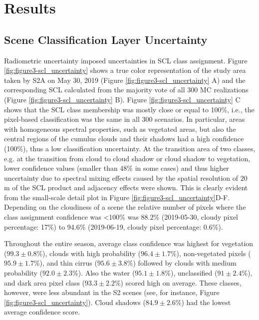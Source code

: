 \section{Results}
\label{sec:unc_results}

\subsection{Scene Classification Layer Uncertainty}
Radiometric uncertainty imposed uncertainties in \gls{SCL} class assignment. Figure \ref{fig:figure3-scl_uncertainty} shows a true color representation of the study area taken by S2A on May 30, 2019 (Figure \ref{fig:figure3-scl_uncertainty} A) and the corresponding \gls{SCL} calculated from the majority vote of all 300  \gls{MC} realizations (Figure \ref{fig:figure3-scl_uncertainty} B). Figure \ref{fig:figure3-scl_uncertainty} C shows that the \gls{SCL} class membership was mostly close or equal to 100\%, i.e., the pixel-based classification was the same in all 300 scenarios. In particular, areas with homogeneous spectral properties, such as vegetated areas, but also the central regions of the cumulus clouds and their shadows had a high confidence (100\%), thus a low classification uncertainty. At the transition area of two classes, e.g. at the transition from cloud to cloud shadow or cloud shadow to vegetation, lower confidence values (smaller than 48\% in some cases) and thus higher uncertainty due to spectral mixing effects caused by the spatial resolution of $20$ m of the \gls{SCL} product and adjacency effects were shown. This is clearly evident from the small-scale detail plot in Figure \ref{fig:figure3-scl_uncertainty}D-F. Depending on the cloudiness of a scene the relative number of pixels where the class assignment confidence was <100\% was 88.2\% (2019-05-30, cloudy pixel percentage: 17\%) to 94.6\% (2019-06-19, cloudy pixel percentage: 0.6\%).

Throughout the entire season, average class confidence was highest for vegetation ($99.3\pm0.8$\%), clouds with high probability ($96.4\pm1.7$\%), non-vegetated pixels ($95.9\pm1.7$\%), and thin cirrus ($95.6\pm3.8$\%) followed by clouds with medium probability ($92.0\pm2.3$\%). Also the water ($95.1\pm1.8$\%), unclassified ($91\pm2.4$\%), and dark area pixel class ($93.3\pm2.2$\%) scored high on average. These classes, however, were less abundant in the \gls{S2} scenes (see, for instance, Figure \ref{fig:figure3-scl_uncertainty}). Cloud shadows ($84.9\pm2.6$\%) had the lowest average confidence score.

